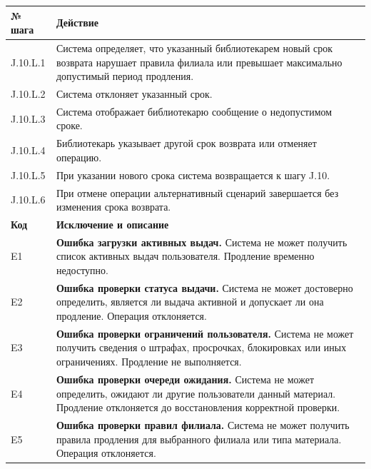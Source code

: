 \documentclass[12pt,a4paper]{article}
\begin{document}
\begin{xltabular}{\textwidth}{
				|>{\raggedright\arraybackslash}p{2.7cm}
				|>{\raggedright\arraybackslash}X|
			}
			
			\textbf{№ шага} & \textbf{Действие} \\
			\hline
			
			J.10.L.1 & Система определяет, что указанный библиотекарем новый срок возврата
			нарушает правила филиала или превышает максимально допустимый
			период продления. \\
			\hline
			J.10.L.2 & Система отклоняет указанный срок. \\
			\hline
			J.10.L.3 & Система отображает библиотекарю сообщение о недопустимом сроке. \\
			\hline
			J.10.L.4 & Библиотекарь указывает другой срок возврата или отменяет операцию. \\
			\hline
			J.10.L.5 & При указании нового срока система возвращается к шагу J.10. \\
			\hline
			J.10.L.6 & При отмене операции альтернативный сценарий завершается без
			изменения срока возврата. \\
			\hline
			
			
			\textbf{Код} & \textbf{Исключение и описание} \\
			\hline
			
			E1 &
			\textbf{Ошибка загрузки активных выдач.}
			Система не может получить список активных выдач пользователя.
			Продление временно недоступно. \\
			\hline
			
			E2 &
			\textbf{Ошибка проверки статуса выдачи.}
			Система не может достоверно определить, является ли выдача активной
			и допускает ли она продление. Операция отклоняется. \\
			\hline
			
			E3 &
			\textbf{Ошибка проверки ограничений пользователя.}
			Система не может получить сведения о штрафах, просрочках,
			блокировках или иных ограничениях. Продление не выполняется. \\
			\hline
			
			E4 &
			\textbf{Ошибка проверки очереди ожидания.}
			Система не может определить, ожидают ли другие пользователи данный
			материал. Продление отклоняется до восстановления корректной проверки. \\
			\hline
			
			E5 &
			\textbf{Ошибка проверки правил филиала.}
			Система не может получить правила продления для выбранного филиала
			или типа материала. Операция отклоняется. \\
			\hline
			

\end{xltabular}
\end{document}
